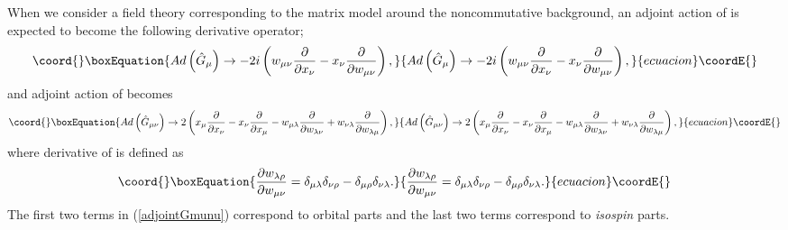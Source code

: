 \documentclass[a4paper,11pt]{article}
\begin{document}
When we consider a field theory corresponding to 
the matrix model around the noncommutative background, 
an adjoint action of \coordHE{} is expected to become 
the following derivative operator; 
\begin{equation}\coord{}\boxEquation{
Ad\left(\hat{G}_{\mu} \right)\rightarrow -2i\left(
w_{\mu\nu}\frac{\partial}{\partial x_{\nu}}
- x_{\nu}\frac{\partial}{\partial w_{\mu\nu}}
\right), 
}{
Ad\left(\hat{G}_{\mu} \right)\rightarrow -2i\left(
w_{\mu\nu}\frac{\partial}{\partial x_{\nu}}
- x_{\nu}\frac{\partial}{\partial w_{\mu\nu}}
\right), 
}{ecuacion}\coordE{}\end{equation}
and adjoint action of \coordHE{} becomes 
\begin{equation}\coord{}\boxEquation{
Ad\left(\hat{G}_{\mu\nu} \right)\rightarrow 2\left(
x_{\mu}\frac{\partial}{\partial x_{\nu}}
-x_{\nu}\frac{\partial}{\partial x_{\mu}}
-w_{\mu\lambda}\frac{\partial}{\partial w_{\lambda\nu}}
+w_{\nu\lambda}\frac{\partial}{\partial w_{\lambda\mu}}
\right), 
\label{adjointGmunu}
}{
Ad\left(\hat{G}_{\mu\nu} \right)\rightarrow 2\left(
x_{\mu}\frac{\partial}{\partial x_{\nu}}
-x_{\nu}\frac{\partial}{\partial x_{\mu}}
-w_{\mu\lambda}\frac{\partial}{\partial w_{\lambda\nu}}
+w_{\nu\lambda}\frac{\partial}{\partial w_{\lambda\mu}}
\right), 
}{ecuacion}\coordE{}\end{equation}
where derivative of \coordHE{} is defined as 
\begin{equation}\coord{}\boxEquation{
\frac{\partial w_{\lambda\rho}}{\partial w_{\mu\nu}}
=\delta_{\mu\lambda}\delta_{\nu\rho}-\delta_{\mu\rho}\delta_{\nu\lambda}. 
}{
\frac{\partial w_{\lambda\rho}}{\partial w_{\mu\nu}}
=\delta_{\mu\lambda}\delta_{\nu\rho}-\delta_{\mu\rho}\delta_{\nu\lambda}. 
}{ecuacion}\coordE{}\end{equation}
The first two terms in (\ref{adjointGmunu}) correspond to 
orbital parts and the last two terms correspond to {\it isospin} parts. 
\end{document}
